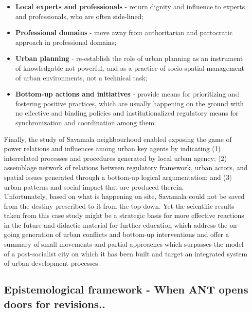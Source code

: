 \documentclass[11pt]{report}
\begin{document}
{\begin{itemize}
\item \textbf{Local experts and professionals} - return dignity and influence to experts and professionals, who are often side-lined;

\item \textbf{Professional domains} - move away from authoritarian and partocratic approach in professional domains;

\item \textbf{Urban planning} - re-establish the role of urban planning as an instrument of knowledgable not powerful, and as a practice of socio-spatial management of urban environments, not a technical task;

\item \textbf{Bottom-up actions and initiatives}  - provide means for prioritizing and fostering positive practices, which are usually happening on the ground with no effective  and  binding policies  and institutionalized  regulatory  means  for synchronization  and  coordination  among  them.
\end{itemize}

Finally, the study of Savamala neighbourhood enabled exposing the game of power relations and influences among urban key agents by indicating
(1)	interrelated processes and procedures generated by local urban agency;
(2)	assemblage network of relations between regulatory framework, urban actors,  and spatial issues generated through a bottom-up logical argumentation;
and
(3)	urban  patterns  and  social  impact that are produced therein.  
\\

Unfortunately, based on what is happening on site, Savamala could not be saved from the destiny prescribed to it from the top-down.
Yet the scientific results taken from this case study might be a strategic basis for more effective reactions in the future and didactic material for further education which address the on-going generation of urban conflicts and bottom-up interventions and offer a summary of small movements and partial approaches which surpasses the model of a post-socialist city on which it has been built and target an integrated system of urban development processes.
 
\subsection{Epistemological framework - When ANT opens doors for revisions..}
 
}
\end{document}
